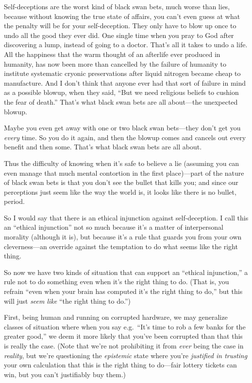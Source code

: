 {
 Self-deceptions are the worst kind of black swan bets, much worse
than lies, because without knowing the true state of affairs, you
can't even guess at what the penalty will be for your
self-deception. They only have to blow up once to undo all the good
they ever did. One single time when you pray to God after discovering a
lump, instead of going to a doctor. That's all it takes
to undo a life. All the happiness that the warm thought of an afterlife
ever produced in humanity, has now been more than cancelled by the
failure of humanity to institute systematic cryonic preservations after
liquid nitrogen became cheap to manufacture. And I
don't think that anyone ever had that sort of failure
in mind as a possible blowup, when they said, ``But we
need religious beliefs to cushion the fear of
death.'' That's what black swan bets
are all about---the unexpected blowup.}

{
 Maybe you even get away with one or two black swan bets---they
don't get you \textit{every} time. So you do it again,
and then the blowup comes and cancels out every benefit and then some.
That's what black swan bets are all about.}

{
 Thus the difficulty of knowing when it's safe to
believe a lie (assuming you can even manage that much mental contortion
in the first place)---part of the nature of black swan bets is that you
don't see the bullet that kills you; and since our
perceptions just seem like the way the world is, it looks like there is
no bullet, period.}

{
 So I would say that there is an ethical injunction against
self-deception. I call this an ``ethical
injunction'' not so much because it's
a matter of interpersonal morality (although it is), but because
it's a rule that guards you from your own
cleverness---an override against the temptation to do what seems like
the right thing.}

{
 So now we have two kinds of situation that can support an
``ethical injunction,'' a rule not
to do something even when it's the right thing to do.
(That is, you refrain ``even when your brain has
computed it's the right thing to
do,'' but this will just \textit{seem like}
``the right thing to do.'')}

{
First, being human and running on corrupted hardware, we may
generalize classes of situation where when you say e.g.~``It's
time to rob a few banks for the
greater good,'' we deem it more likely that
you've been corrupted than that this is really the
case. (Note that we're not prohibiting it from
\textit{ever} being the case in \textit{reality}, but
we're questioning the \textit{epistemic} state where
you're \textit{justified in trusting} your own
calculation that this is the right thing to do---fair lottery tickets
can win, but you can't justifiably buy them.)}

